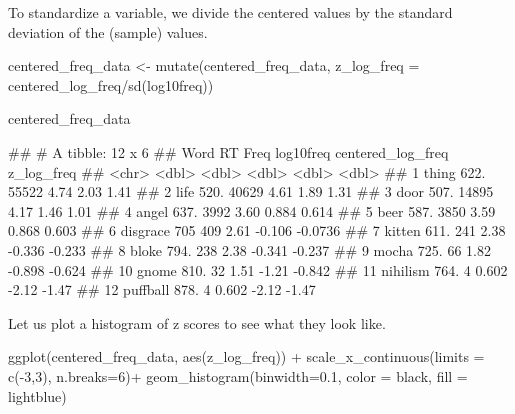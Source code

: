 \documentclass[
]{book}
\newenvironment{Shaded}{\begin{snugshade}}{\end{snugshade}}
\newcommand{\AttributeTok}[1]{\textcolor[rgb]{0.77,0.63,0.00}{#1}}
\newcommand{\DecValTok}[1]{\textcolor[rgb]{0.00,0.00,0.81}{#1}}
\newcommand{\FloatTok}[1]{\textcolor[rgb]{0.00,0.00,0.81}{#1}}
\newcommand{\FunctionTok}[1]{\textcolor[rgb]{0.00,0.00,0.00}{#1}}
\newcommand{\NormalTok}[1]{#1}
\newcommand{\OtherTok}[1]{\textcolor[rgb]{0.56,0.35,0.01}{#1}}
\newcommand{\SpecialCharTok}[1]{\textcolor[rgb]{0.00,0.00,0.00}{#1}}
\newcommand{\StringTok}[1]{\textcolor[rgb]{0.31,0.60,0.02}{#1}}
\begin{document}
To standardize a variable, we divide the centered values by the standard deviation of the (sample) values.

\begin{Shaded}
\begin{Highlighting}[]
\NormalTok{centered\_freq\_data }\OtherTok{\textless{}{-}} \FunctionTok{mutate}\NormalTok{(centered\_freq\_data, }\AttributeTok{z\_log\_freq =}\NormalTok{ centered\_log\_freq}\SpecialCharTok{/}\FunctionTok{sd}\NormalTok{(log10freq))}

\NormalTok{centered\_freq\_data}
\end{Highlighting}
\end{Shaded}

\begin{Shaded}
\begin{Highlighting}[]
\NormalTok{\#\# \# A tibble: 12 x 6}
\NormalTok{\#\#    Word        RT  Freq log10freq centered\_log\_freq z\_log\_freq}
\NormalTok{\#\#    \textless{}chr\textgreater{}    \textless{}dbl\textgreater{} \textless{}dbl\textgreater{}     \textless{}dbl\textgreater{}             \textless{}dbl\textgreater{}      \textless{}dbl\textgreater{}}
\NormalTok{\#\#  1 thing     622. 55522     4.74              2.03      1.41  }
\NormalTok{\#\#  2 life      520. 40629     4.61              1.89      1.31  }
\NormalTok{\#\#  3 door      507. 14895     4.17              1.46      1.01  }
\NormalTok{\#\#  4 angel     637.  3992     3.60              0.884     0.614 }
\NormalTok{\#\#  5 beer      587.  3850     3.59              0.868     0.603 }
\NormalTok{\#\#  6 disgrace  705    409     2.61             {-}0.106    {-}0.0736}
\NormalTok{\#\#  7 kitten    611.   241     2.38             {-}0.336    {-}0.233 }
\NormalTok{\#\#  8 bloke     794.   238     2.38             {-}0.341    {-}0.237 }
\NormalTok{\#\#  9 mocha     725.    66     1.82             {-}0.898    {-}0.624 }
\NormalTok{\#\# 10 gnome     810.    32     1.51             {-}1.21     {-}0.842 }
\NormalTok{\#\# 11 nihilism  764.     4     0.602            {-}2.12     {-}1.47  }
\NormalTok{\#\# 12 puffball  878.     4     0.602            {-}2.12     {-}1.47}
\end{Highlighting}
\end{Shaded}

Let us plot a histogram of z scores to see what they look like.

\begin{Shaded}
\begin{Highlighting}[]
\FunctionTok{ggplot}\NormalTok{(centered\_freq\_data, }\FunctionTok{aes}\NormalTok{(z\_log\_freq)) }\SpecialCharTok{+}
    \FunctionTok{scale\_x\_continuous}\NormalTok{(}\AttributeTok{limits =} \FunctionTok{c}\NormalTok{(}\SpecialCharTok{{-}}\DecValTok{3}\NormalTok{,}\DecValTok{3}\NormalTok{), }\AttributeTok{n.breaks=}\DecValTok{6}\NormalTok{)}\SpecialCharTok{+}
        \FunctionTok{geom\_histogram}\NormalTok{(}\AttributeTok{binwidth=}\FloatTok{0.1}\NormalTok{,}
                       \AttributeTok{color =} \StringTok{\textquotesingle{}black\textquotesingle{}}\NormalTok{,}
                       \AttributeTok{fill =} \StringTok{\textquotesingle{}lightblue\textquotesingle{}}\NormalTok{)}
\end{Highlighting}
\end{Shaded}
\end{document}
